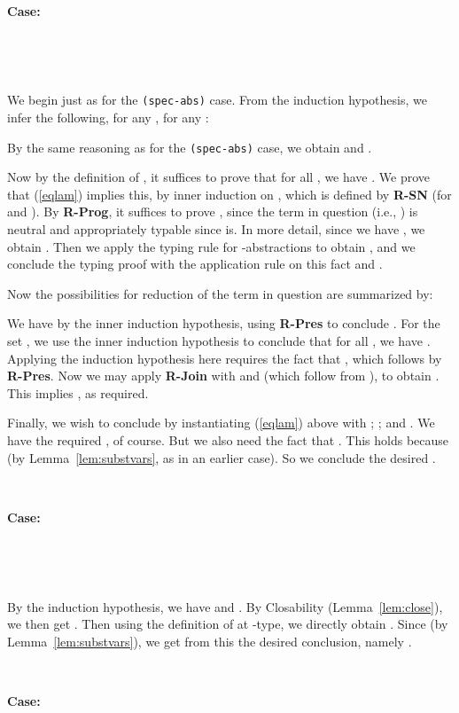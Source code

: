 \documentclass[copyright]{eptcs}
\begin{document}
\ 

\noindent \textbf{Case:}

\



\ 

\noindent We begin just as for the \texttt{(spec-abs)} case.  From the
induction hypothesis, we infer the following, for any
, for any
:

\noindent By the same reasoning as for the \texttt{(spec-abs)} case,
we obtain  and .

Now by the definition of , it suffices to prove that
for all , we have .  We
prove that (\ref{eqlam}) implies this, by inner induction on
, which is defined by \textbf{R-SN} (for
 and ).  By \textbf{R-Prog}, it suffices to prove
, since the term in question
(i.e., ) is neutral and appropriately
typable since  is.  In more detail, since we have , we obtain
.  Then we apply the
typing rule for -abstractions to obtain , and we conclude the typing
proof with the application rule on this fact and .

Now the possibilities for reduction of the term in question are
summarized by:


\noindent We have  by the inner
induction hypothesis, using \textbf{R-Pres} to conclude .  For the set , we use the inner induction hypothesis to
conclude that for all , we have .  Applying the
induction hypothesis here requires the fact that
, which follows by \textbf{R-Pres}.
Now we may apply \textbf{R-Join} with  and
 (which follow from ), to
obtain .  This implies , as
required.

Finally, we wish to conclude  by instantiating (\ref{eqlam}) above with
; ; and . We
have the required , of course.
But we also need the fact that .  This holds because  (by
Lemma~\ref{lem:substvars}, as in an earlier case).  So we conclude the
desired .

\ 

\noindent \textbf{Case:}

\



\ 

\noindent By the induction hypothesis, we have  and .  By Closability
(Lemma~\ref{lem:close}), we then get .  Then using the definition of
 at -type, we directly obtain .  Since
 (by Lemma~\ref{lem:substvars}), we get
from this the desired conclusion, namely .

\ 

\noindent \textbf{Case:}

\
\end{document}
